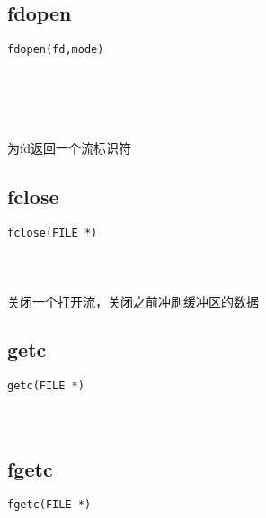 \documentclass[10pt,a4paper]{article}
\begin{document}
\subsection{fdopen}
\begin{spacing}{2.0}
\lstset{language=C,numbers=none}
\begin{lstlisting}
fdopen(fd,mode)
\end{lstlisting}
{\large\color[rgb]{0.2,0.4,0.6}{fd:}} \\
{\large\color[rgb]{0.2,0.4,0.6}{mode:}}
\paragraph{ \ \ }为fd返回一个流标识符
\end{spacing}

\subsection{fclose}
\begin{spacing}{2.0}
\lstset{language=C,numbers=none}
\begin{lstlisting}
fclose(FILE *)
\end{lstlisting}
{\large\color[rgb]{0.2,0.4,0.6}{*:}}
\paragraph{ \ \ }关闭一个打开流，关闭之前冲刷缓冲区的数据
\end{spacing}

\subsection{getc}
\begin{spacing}{2.0}
\lstset{language=C,numbers=none}
\begin{lstlisting}
getc(FILE *)
\end{lstlisting}
{\large\color[rgb]{0.2,0.4,0.6}{*:}}
\paragraph{ \ \ }
\end{spacing}

\subsection{fgetc}
\begin{spacing}{2.0}
\lstset{language=C,numbers=none}
\begin{lstlisting}
fgetc(FILE *)
\end{lstlisting}
{\large\color[rgb]{0.2,0.4,0.6}{*:}}
\paragraph{ \ \ }
\end{spacing}
\end{document}
